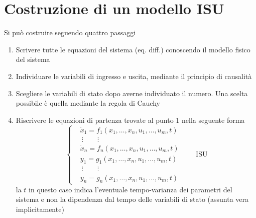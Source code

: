 \section{Costruzione di un modello ISU}
Si può costruire seguendo quattro passaggi
\begin{enumerate}
\item Scrivere tutte le equazioni del sistema (eq. diff.) conoscendo il modello fisico del sistema
\item Individuare le variabili di ingresso e uscita, mediante il principio di causalità
\item Scegliere le variabili di stato dopo averne individuato il numero. Una scelta possibile è
quella mediante la regola di Cauchy
\item Riscrivere le equazioni di partenza trovate al punto 1 nella seguente forma
\begin{equation}\left\{ \begin{aligned}
&\dot{x}_1 = f_1\left(x_1,\dots,x_n,u_1,\dots,u_m,t\right)\\
&\ \vdots \qquad \vdots\\
&\dot{x}_n = f_n\left(x_1,\dots,x_n,u_1,\dots,u_m,t\right)\\
&y_1 = g_1\left(x_1,\dots,x_n,u_1,\dots,u_m,t\right) \\
&\ \vdots \qquad \vdots\\
&y_n = g_n\left(x_1,\dots,x_n,u_1,\dots,u_m,t\right)
\end{aligned}\right.\qquad\text{ISU}\end{equation}
la $t$ in questo caso indica l'eventuale tempo-varianza dei parametri del sistema e non la
dipendenza dal tempo delle variabili di stato (assunta vera implicitamente)
\end{enumerate}
